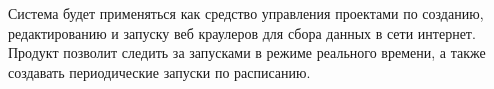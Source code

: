 Система будет применяться как средство управления проектами по созданию, редактированию и запуску веб краулеров для сбора данных в сети интернет. Продукт позволит следить за запусками в режиме реального времени, а также создавать периодические запуски по расписанию.
